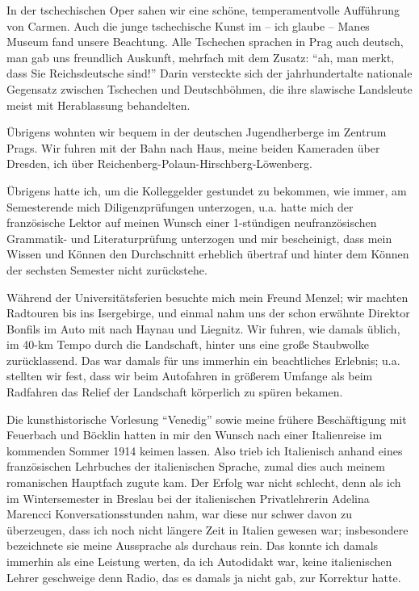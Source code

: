 \documentclass[a5paper,pagesize,10pt,twoside=true]{scrbook}
\renewcommand{\marginpar}[2][]{}
\begin{document}
In der tschechischen Oper sahen wir eine schöne, temperamentvolle Aufführung von Carmen. Auch die junge tschechische Kunst im -- ich glaube -- Manes Museum fand unsere Beachtung. Alle Tschechen sprachen in Prag auch deutsch, man gab uns freundlich Auskunft, mehrfach mit dem Zusatz: \enquote{ah, man merkt, dass Sie Reichsdeutsche sind!} Darin versteckte sich der jahrhundertalte nationale Gegensatz zwischen Tschechen und Deutschböhmen, die ihre slawische Landsleute meist mit Herablassung behandelten.

Übrigens wohnten wir bequem in der deutschen Jugendherberge im Zentrum Prags. Wir fuhren mit der Bahn nach Haus, meine beiden Kameraden über Dresden, ich über Reichenberg-Polaun-Hirschberg-Löwenberg.

Übrigens hatte ich, um die Kolleggelder gestundet zu bekommen, wie immer, am Semesterende mich Diligenzprüfungen unterzogen, u.a. hatte mich der französische Lektor auf meinen Wunsch einer 1-stündigen neufranzösischen Grammatik- und Literaturprüfung unterzogen und mir bescheinigt, dass mein Wissen und Können den Durchschnitt erheblich übertraf und hinter dem Können der sechsten Semester nicht zurückstehe.

Während der Universitätsferien besuchte mich mein Freund Menzel; wir machten Radtouren bis ins Isergebirge, und einmal nahm uns der schon erwähnte Direktor Bonfils im Auto mit nach Haynau und Liegnitz. Wir fuhren, wie damals üblich, im 40-km Tempo durch die Landschaft, hinter uns eine große Staubwolke zurücklassend. Das war damals für uns immerhin ein beachtliches Erlebnis; u.a. stellten wir fest, dass wir beim Autofahren in größerem Umfange als beim Radfahren das Relief der Landschaft körperlich zu spüren bekamen.

\marginpar{156}
Die kunsthistorische Vorlesung \enquote{Venedig} sowie meine frühere Beschäftigung mit Feuerbach und Böcklin hatten in mir den Wunsch nach einer Italienreise im kommenden Sommer 1914 keimen lassen. Also trieb ich Italienisch anhand eines französischen Lehrbuches der italienischen Sprache, zumal dies auch meinem romanischen Hauptfach zugute kam. Der Erfolg war nicht schlecht, denn als ich im Wintersemester in Breslau bei der italienischen Privatlehrerin Adelina Marencci Konversationsstunden nahm, war diese nur schwer davon zu überzeugen, dass ich noch nicht längere Zeit in Italien gewesen war; insbesondere bezeichnete sie meine Aussprache als durchaus rein. Das konnte ich damals immerhin als eine Leistung werten, da ich Autodidakt war, keine italienischen Lehrer geschweige denn Radio, das es damals ja nicht gab, zur Korrektur hatte.\\
\end{document}
